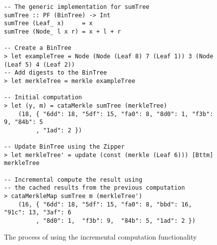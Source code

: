 \begin{figure}[H]
\captionsetup{justification=justified,singlelinecheck=false,margin=0cm}
\begin{verbatim}
-- The generic implementation for sumTree
sumTree :: PF (BinTree) -> Int
sumTree (Leaf_ x)     = x
sumTree (Node_ l x r) = x + l + r

-- Create a BinTree
> let exampleTree = Node (Node (Leaf 8) 7 (Leaf 1)) 3 (Node (Leaf 5) 4 (Leaf 2))
-- Add digests to the BinTree
> let merkleTree = merkle exampleTree

-- Initial computation
> let (y, m) = cataMerkle sumTree (merkleTree)
    (18, { "6dd": 18, "5df": 15, "fa0": 8, "8d0": 1, "f3b": 9, "84b": 5
         , "1ad": 2 })

-- Update BinTree using the Zipper
> let merkleTree' = update (const (merkle (Leaf 6))) [Bttm] merkleTree

-- Incremental compute the result using
-- the cached results from the previous computation
> cataMerkleMap sumTree m (merkleTree')
    (16, { "6dd": 18, "5df": 15, "fa0": 8, "bbd": 16, "91c": 13, "3af": 6
         , "8d0": 1,  "f3b": 9,  "84b": 5, "1ad": 2 })         
\end{verbatim}
\caption{The process of using the incremental computation functionality}
\label{<label>}
\end{figure}
